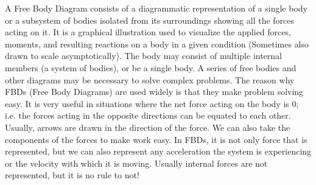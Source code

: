 \begin{phybox}{}
{A Free Body Diagram consists of a diagrammatic representation of a single body or a subsystem of bodies isolated from its surroundings showing all the forces acting on it. It is a graphical illustration used to visualize the applied forces, moments, and resulting reactions on a body in a given condition (Sometimes also drawn to scale asymptotically). The body may consist of multiple internal members (a system of bodies), or be a single body. A series of free bodies and other diagrams may be necessary to solve complex problems. The reason why FBDs (Free Body Diagrams) are used widely is that they make problem solving easy. It is very useful in situations where the net force acting on the body is 0; i.e. the forces acting in the opposite directions can be equated to each other. Usually, arrows are drawn in the direction of the force. We can also take the components of the forces to make work easy. In FBDs, it is not only force that is represented, but we can also represent any acceleration the system is experiencing or the velocity with which it is moving. Usually internal forces are not represented, but it is no rule to not!

}
\end{phybox}

